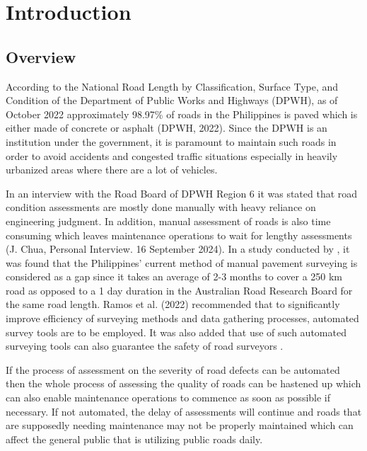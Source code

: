 \chapter{Introduction}
\label{sec:researchdesc}    %

\section{Overview}
\label{sec:overview}

According to the National Road Length by Classification, Surface Type, and Condition of the Department of Public Works and Highways (DPWH), as of October 2022 approximately 98.97\% of roads in the Philippines is paved which is either made of concrete or asphalt (DPWH, 2022). Since the DPWH is an institution under the government, it is paramount to maintain such roads in order to avoid accidents and congested traffic situations especially in heavily urbanized areas where there are a lot of vehicles.


In an interview with the Road Board of DPWH Region 6 it was stated that road condition assessments are mostly done manually with heavy reliance on engineering judgment. In addition, manual assessment of roads is also time consuming which leaves maintenance operations to wait for lengthy assessments (J. Chua, Personal Interview. 16 September 2024).  In a study conducted by \cite{ramos2023}, it was found that the Philippines’ current method of manual pavement surveying is considered as a gap since it takes an average of 2-3 months to cover a 250 km road as opposed to a 1 day duration in the Australian Road Research Board for the same road length. Ramos et al. (2022) recommended that to significantly improve efficiency of surveying methods and data gathering processes, automated survey tools are to be employed. It was also added that use of such automated surveying tools can also guarantee the safety of road surveyors \cite{ramos2023}.


If the process of assessment on the severity of road defects can be automated then the whole process of assessing the quality of roads can be hastened up which can also enable maintenance operations to commence as soon as possible if necessary. If not automated, the delay of assessments will continue and roads that are supposedly needing maintenance may not be properly maintained which can affect the general public that is utilizing public roads daily.


